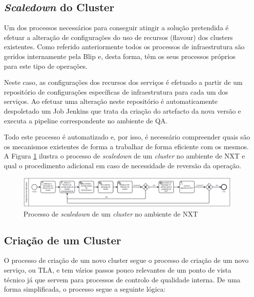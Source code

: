 \subsection{\textit{Scaledown} do Cluster}

Um dos processos necessários para conseguir atingir a solução pretendida é efetuar a alteração
de configurações do uso de recursos (\gls{flavour}) dos \glspl{cluster} existentes. Como
referido anteriormente todos os processos de infraestrutura são geridos internamente pela Blip e,
desta forma, têm os seus processos próprios para este tipo de operações.

Neste caso, as configurações dos recursos dos serviços é efetuado a partir de um repositório 
de configurações específicas de infraestrutura para cada um dos serviços. Ao efetuar uma alteração
neste repositório é automaticamente despoletado um Job Jenkins que trata da criação do artefacto
da nova versão e executa a \gls{pipeline} correspondente no ambiente de \ac{QA}.

Todo este processo é automatizado e, por isso, é necessário compreender quais são os mecanismos
existentes de forma a trabalhar de forma eficiente com os mesmos. A Figura \ref{scaledown-nxt} 
ilustra o processo de \textit{scaledown} de um \textit{cluster} no ambiente de NXT e qual o 
procedimento adicional em caso de necessidade de reversão da operação.

\begin{figure}[H]
  \centerline{\includegraphics[scale=0.12]{media/content/impl/scaledown_nxt.png}}
  \caption{Processo de \textit{scaledown} de um \textit{cluster} no ambiente de NXT}
  \label{scaledown-nxt}
\end{figure}

\subsection{Criação de um Cluster}

O processo de criação de um novo \gls{cluster} segue o processo de criação de um novo serviço, ou
\ac{TLA}, e tem vários passos pouco relevantes de um ponto de vista técnico já que servem para
processos de controlo de qualidade interna. De uma forma simplificada, o processo segue a seguinte
lógica:


